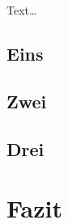 \documentclass[11pt,a4paper]{report}
\begin{document}
Text\ldots

\section{Eins}

\section{Zwei}

\section{Drei}



\chapter{Fazit} \label{chap:fazit}


\newpage





\end{document}
